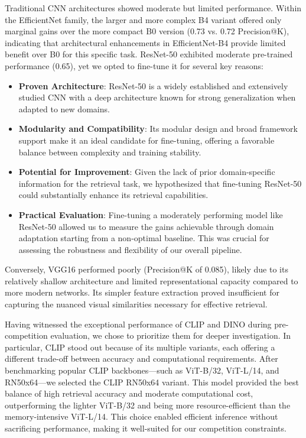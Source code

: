 Traditional CNN architectures showed moderate but limited performance. Within the EfficientNet family, the larger and more complex B4 variant offered only marginal gains over the more compact B0 version (0.73 vs. 0.72 Precision@K), indicating that architectural enhancements in EfficientNet-B4 provide limited benefit over B0 for this specific task. ResNet-50 exhibited moderate pre-trained performance (0.65), yet we opted to fine-tune it for several key reasons:
\begin{itemize}
\item {\bf Proven Architecture}: ResNet-50 is a widely established and extensively studied CNN with a deep architecture known for strong generalization when adapted to new domains.

\item {\bf Modularity and Compatibility}: Its modular design and broad framework support make it an ideal candidate for fine-tuning, offering a favorable balance between complexity and training stability.

\item {\bf Potential for Improvement}: Given the lack of prior domain-specific information for the retrieval task, we hypothesized that fine-tuning ResNet-50 could substantially enhance its retrieval capabilities.

\item {\bf Practical Evaluation}: Fine-tuning a moderately performing model like ResNet-50 allowed us to measure the gains achievable through domain adaptation starting from a non-optimal baseline. This was crucial for assessing the robustness and flexibility of our overall pipeline.
\end{itemize}
Conversely, VGG16 performed poorly (Precision@K of 0.085), likely due to its relatively shallow architecture and limited representational capacity compared to more modern networks. Its simpler feature extraction proved insufficient for capturing the nuanced visual similarities necessary for effective retrieval.

Having witnessed the exceptional performance of CLIP and DINO during pre-competition evaluation, we chose to prioritize them for deeper investigation. In particular, CLIP stood out because of its multiple variants, each offering a different trade-off between accuracy and computational requirements. After benchmarking popular CLIP backbones—such as ViT-B/32, ViT-L/14, and RN50x64—we selected the CLIP RN50x64 variant. This model provided the best balance of high retrieval accuracy and moderate computational cost, outperforming the lighter ViT-B/32 and being more resource-efficient than the memory-intensive ViT-L/14. This choice enabled efficient inference without sacrificing performance, making it well-suited for our competition constraints.

